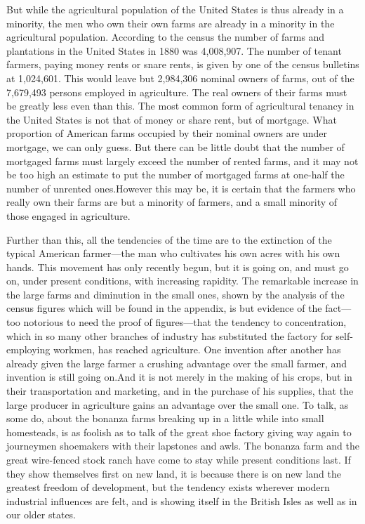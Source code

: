 \documentclass{book}
\begin{document}
But while the agricultural population of the United States is thus already in a minority, the men who own their own farms are already in a minority in the agricultural population. According to the census the number of farms and plantations in the United States in 1880 was 4,008,907. The number of tenant farmers, paying money rents or snare rents, is given by one of the census bulletins at 1,024,601. This would leave but 2,984,306 nominal owners of farms, out of the 7,679,493 persons employed in agriculture. The real owners of their farms must be greatly less even than this. The most common form of agricultural tenancy in the United States is not that of money or share rent, but of mortgage. What proportion of American farms occupied by their nominal owners are under mortgage, we can only guess. But there can be little doubt that the number of mortgaged farms must largely exceed the number of rented farms, and it may not be too high an estimate to put the number of mortgaged farms at one-half the number of unrented ones.\footnotemark[3] However this may be, it is certain that the farmers who really own their farms are but a minority of farmers, and a small minority of those engaged in agriculture.

Further than this, all the tendencies of the time are to the extinction of the typical American farmer—the man who cultivates his own acres with his own hands. This movement has only recently begun, but it is going on, and must go on, under present conditions, with increasing rapidity. The remarkable increase in the large farms and diminution in the small ones, shown by the analysis of the census figures which will be found in the appendix, is but evidence of the fact—too notorious to need the proof of figures—that the tendency to concentration, which in so many other branches of industry has substituted the factory for self-employing workmen, has reached agriculture. One invention after another has already given the large farmer a crushing advantage over the small farmer, and invention is still going on.\footnotemark[4] And it is not merely in the making of his crops, but in their transportation and marketing, and in the purchase of his supplies, that the large producer in agriculture gains an advantage over the small one. To talk, as some do, about the bonanza farms breaking up in a little while into small homesteads, is as foolish as to talk of the great shoe factory giving way again to journeymen shoemakers with their lapstones and awls. The bonanza farm and the great wire-fenced stock ranch have come to stay while present conditions last. If they show themselves first on new land, it is because there is on new land the greatest freedom of development, but the tendency exists wherever modern industrial influences are felt, and is showing itself in the British Isles as well as in our older states.\footnotemark[5]
\end{document}
